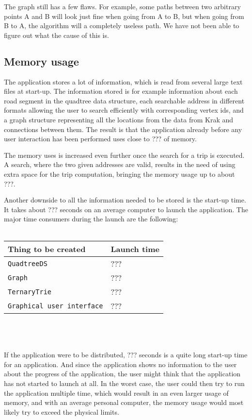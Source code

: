 \documentclass[a4paper,11pt]{article}
\begin{document}
The graph still has a few flaws. For example, some paths between two arbitrary points A and B will look just fine when going from A to B, but when going from B to A, the algorithm will a completely useless path. We have not been able to figure out what the cause of this is.

\subsection{Memory usage}
The application stores a lot of information, which is read from several large text files at start-up. The information stored is for example information about each road segment in the quadtree data structure, each searchable address in different formats allowing the user to search efficiently with corresponding vertex ids, and a graph structure representing all the locations from the data from Krak and connections between them. The result is that the application already before any user interaction has been performed uses close to ??? of memory.

The memory uses is increased even further once the search for a trip is executed. A search, where the two given addresses are valid, results in the need of using extra space for the trip computation, bringing the memory usage up to about ???.

Another downside to all the information needed to be stored is the start-up time. It takes about ??? seconds on an average computer to launch the application. The major time consumers during the launch are the following: \\ \\
\begin{tabular}{ p{5cm} | p{3cm} }
	\textbf{Thing to be created} & \textbf{Launch time} \\
	\hline
	\texttt{QuadtreeDS} & ??? \\
	\texttt{Graph} & ??? \\
	\texttt{TernaryTrie} & ??? \\
	\texttt{Graphical user interface} & ???
\end{tabular}
\\ \\ \\
If the application were to be distributed, ??? seconds is a quite long start-up time for an application. And since the application shows no information to the user about the progress of the application, the user might think that the application has not started to launch at all. In the worst case, the user could then try to run the application multiple time, which would result in an even larger usage of memory, and with an average personal computer, the memory usage would most likely try to exceed the physical limits.
\end{document}
